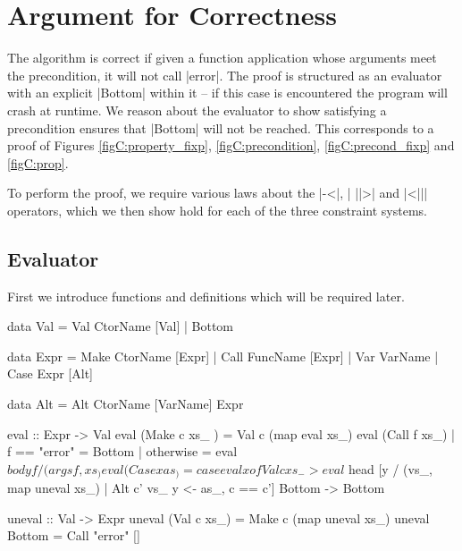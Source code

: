 \section{Argument for Correctness}
\label{secC:correct}

\newcommand{\lemma}[1]{(\textit{#1})}
\newcommand{\theorem}[2]{#2 \hspace{5mm} \lemma{#1} \\}
\newcommand{\proof}[2][]{\paragraph{\lemma{#2} \textsf{#1}}}

The algorithm is correct if given a function application whose arguments meet the precondition, it will not call |error|. The proof is structured as an evaluator with an explicit |Bottom| within it -- if this case is encountered the program will crash at runtime. We reason about the evaluator to show satisfying a precondition ensures that |Bottom| will not be reached. This corresponds to a proof of Figures \ref{figC:property_fixp}, \ref{figC:precondition}, \ref{figC:precond_fixp} and \ref{figC:prop}.

To perform the proof, we require various laws about the |-<|, | ||>| and |<||| operators, which we then show hold for each of the three constraint systems.

\subsection{Evaluator}

First we introduce functions and definitions which will be required later.

\begin{code}
data Val  =  Val CtorName [Val]
          |  Bottom

data Expr  =  Make CtorName [Expr]
           |  Call FuncName [Expr]
           |  Var  VarName
           |  Case Expr [Alt]

data Alt = Alt CtorName [VarName] Expr

eval :: Expr -> Val
eval (Make c xs_   ) = Val c (map eval xs_)
eval (Call f xs_)  | f == "error" = Bottom
                   | otherwise = eval $ body f / (args f, xs_)
eval (Case x as_  ) = case eval x of
    Val c xs_ -> eval $ head [y / (vs_, map uneval xs_) | Alt c' vs_ y <- as_, c == c']
    Bottom -> Bottom

uneval :: Val -> Expr
uneval (Val c xs_)  = Make c (map uneval xs_)
uneval Bottom       = Call "error" []
\end{code}


